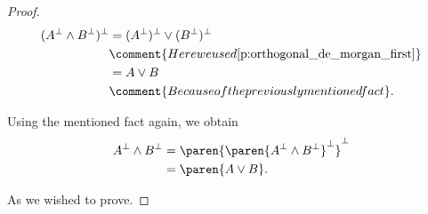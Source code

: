 \begin{proof}
    \begin{align}
        (A^\perp \wedge B^\perp)^\perp  &=  (A^\perp)^\perp \vee (B^\perp)^\perp                            \\
                                        &\comment{Here we used \eqref{p:orthogonal_de_morgan_first}}        \\
                                        &=  A \vee B                                                        \\
                                        &\comment{Because of the previously mentioned fact}.
    \end{align}\pn
    
    Using the mentioned fact again, we obtain
    \begin{align}
        A^\perp \wedge B^\perp      &=  \paren{\paren{A^\perp \wedge B^\perp}^\perp}^\perp    \\
                                    &=  \paren{A \vee B}.
    \end{align}\pn
    
    As we wished to prove.
\end{proof}